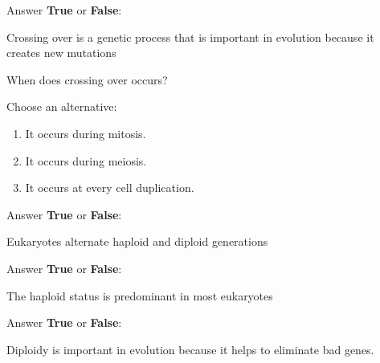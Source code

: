 \begin{Exercise} [
  title={Crossing-Over (1)},
  difficulty={1},
  label={ex9},
  origin={G. Valle}
 ]

Answer \textbf{True} or \textbf{False}:

  \Question Crossing over is a genetic process that is important in evolution
because it creates new mutations

\end{Exercise}

\begin{Exercise} [
  title={Crossing-Over (2)},
  difficulty={1},
  label={ex10},
  origin={G. Valle}
 ]

  \Question When does crossing over occurs?

Choose an alternative:

\begin{enumerate}
  \item It occurs during mitosis.
  \item It occurs during meiosis.
  \item It occurs at every cell duplication.
\end{enumerate}

\end{Exercise}

\begin{Exercise} [
  title={Eukaryotes},
  difficulty={1},
  label={ex11},
  origin={G. Valle}
 ]

Answer \textbf{True} or \textbf{False}:

  \Question Eukaryotes alternate haploid and diploid generations

\end{Exercise}

\begin{Exercise} [
  title={Haploidy},
  difficulty={1},
  label={ex12},
  origin={G. Valle}
 ]

Answer \textbf{True} or \textbf{False}:

  \Question The haploid status is predominant in most eukaryotes

\end{Exercise}

\begin{Exercise} [
  title={Diploidy},
  difficulty={1},
  label={ex13},
  origin={G. Valle}
 ]

Answer \textbf{True} or \textbf{False}:

  \Question Diploidy is important in evolution because it helps to eliminate
bad genes.

\end{Exercise}

